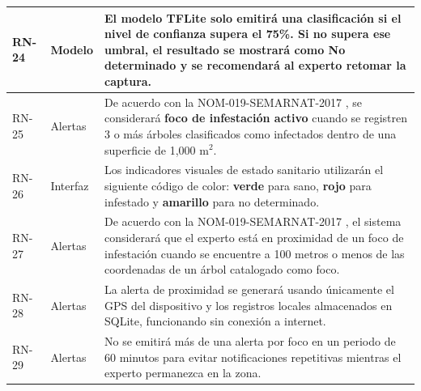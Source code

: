 \begin{longtable}{|>{\centering\arraybackslash}m{1.8cm}|>{\centering\arraybackslash}m{2.5cm}|m{9.5cm}|}
RN-24 & Modelo & El modelo TFLite solo emitirá una clasificación si el nivel de confianza supera el 75\%. Si no supera ese umbral, el resultado se mostrará como \textbf{No determinado} y se recomendará al experto retomar la captura. \\
\hline
RN-25 & Alertas & De acuerdo con la NOM-019-SEMARNAT-2017 \cite{nom019_semarnat_2017}, se considerará \textbf{foco de infestación activo} cuando se registren 3 o más árboles clasificados como infectados dentro de una superficie de 1{,}000 m$^2$. \\
\hline
RN-26 & Interfaz & Los indicadores visuales de estado sanitario utilizarán el siguiente código de color: \textbf{verde} para sano, \textbf{rojo} para infestado y \textbf{amarillo} para no determinado. \\
\hline







RN-27 & Alertas & De acuerdo con la NOM-019-SEMARNAT-2017 \cite{nom019_semarnat_2017}, el sistema considerará que el experto está en proximidad de un foco de infestación cuando se encuentre a 100 metros o menos de las coordenadas de un árbol catalogado como foco. \\
\hline
RN-28 & Alertas & La alerta de proximidad se generará usando únicamente el GPS del dispositivo y los registros locales almacenados en SQLite, funcionando sin conexión a internet. \\
\hline
RN-29 & Alertas & No se emitirá más de una alerta por foco en un periodo de 60 minutos para evitar notificaciones repetitivas mientras el experto permanezca en la zona. \\














\end{longtable}
